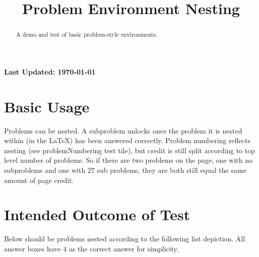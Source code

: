 \documentclass{ximera}
\title{Problem Environment Nesting}
\begin{document}
\begin{abstract}
    A demo and test of basic problem-style environments.
\end{abstract}
\maketitle

{{\Huge \bfseries Last Updated: \today}} \\


\section{Basic Usage}
Problems can be nested. A subproblem unlocks once the problem it is nested within (in the LaTeX) has been answered correctly.
Problem numbering reflects nesting (see problemNumbering test tile), but credit is still split according to top level number of problems.
So if there are two problems on the page, one with no subproblems and one with 27 sub problems, they are both still equal the same amount
of page credit.

\section{Intended Outcome of Test}
Below should be problems nested according to the following list depiction. All answer boxes have $4$ as the correct answer for simplicity.
\end{document}

